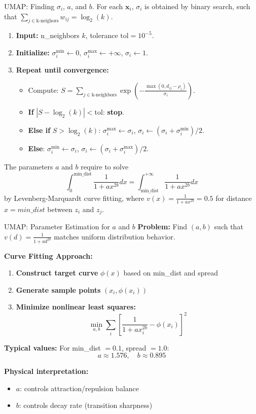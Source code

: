 \documentclass{beamer}
\begin{document}
\begin{frame}{UMAP: Finding $\sigma_i$, $a$, and $b$.}
  For each $\mathbf{x}_i$, $\sigma_i$ is obtained by \alert{binary
    search}, such that $\sum_{j\in \text{k-neighors}} w_{ij} =
  \log_2(k)$.

\begin{enumerate}
\item \textbf{Input:} n\_neighbors $k$, tolerance $\text{tol} = 10^{-5}$.
\item \textbf{Initialize:} $\sigma_i^{\min} \leftarrow 0$, $\sigma_i^{\max} \leftarrow +\infty$, $\sigma_i \leftarrow 1$.
\item \textbf{Repeat until convergence:}
\begin{itemize}
  \item Compute: $S = \sum_{j \in \text{k-neighbors}} \exp\left(-\frac{\max(0, d_{ij} - \rho_i)}{\sigma_i}\right)$.
  \item \textbf{If} $|S - \log_2(k)| < \text{tol}$: \textbf{stop}.
  \item \textbf{Else if} $S > \log_2(k)$: $\sigma_i^{\max} \leftarrow \sigma_i$, $\sigma_i \leftarrow (\sigma_i + \sigma_i^{\min})/2$.
  \item \textbf{Else}: $\sigma_i^{\min} \leftarrow \sigma_i$, $\sigma_i \leftarrow (\sigma_i + \sigma_i^{\max})/2$.
\end{itemize}
\end{enumerate}
\pause \vspace{0.3cm}
The parameters $a$ and $b$ require to solve $$\int_0^{\text{min\_dist}}
\frac{1}{1+ax^{2b}} dx = \int_{\text{min\_dist}}^{+\infty}
\frac{1}{1+ax^{2b}} dx$$ by Levenberg-Marquardt curve fitting, where $v(x)=\frac{1}{1+ax^{2b}}=0.5$ for distance $x=min\_dist$ between $z_i$ and $z_j$.
\end{frame}

\begin{frame}{UMAP: Parameter Estimation for $a$ and $b$}
  \textbf{Problem:} Find $(a,b)$ such that $v(d) = \frac{1}{1+ad^{2b}}$ matches uniform distribution behavior.
  
  \textbf{Curve Fitting Approach:}
  \begin{enumerate}
    \item \textbf{Construct target curve} $\phi(x)$ based on min\_dist and spread
    \item \textbf{Generate sample points} $(x_i, \phi(x_i))$ 
    \item \textbf{Minimize nonlinear least squares:}
    $$\min_{a,b} \sum_{i} \left[\frac{1}{1 + ax_i^{2b}} - \phi(x_i)\right]^2$$
  \end{enumerate}
  
  \textbf{Typical values:} For min\_dist $= 0.1$, spread $= 1.0$:
  $$a \approx 1.576, \quad b \approx 0.895$$
  
  \textbf{Physical interpretation:}
  \begin{itemize}
    \item $a$: controls attraction/repulsion balance
    \item $b$: controls decay rate (transition sharpness)
  \end{itemize}
\end{frame}
\end{document}
